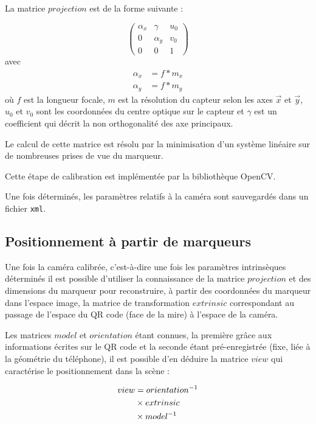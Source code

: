 \documentclass[10pt,a4paper,twoside, twocolumn]{report}
\begin{document}
La matrice $projection$ est de la forme suivante :

\begin{equation}
	\begin{pmatrix}
		\alpha_x	&	\gamma		& u_0	\\
		0					&	\alpha_y	&	v_0	\\
		0					&	0					&	1
	\end{pmatrix}
\end{equation}
avec 
\begin{align*}
	\alpha_x	&= f * m_x	\\
	\alpha_y	&= f * m_y
\end{align*}
où $f$ est la longueur focale, $m$ est la résolution du capteur selon les axes $\vec x$ et $\vec y$, $u_0$ et $v_0$ sont les coordonnées du centre optique sur le capteur et $\gamma$ est un coefficient qui décrit la non orthogonalité des axe principaux.

Le calcul de cette matrice est résolu par la minimisation d’un système linéaire sur de nombreuses prises de vue du marqueur. 

Cette étape de calibration est implémentée par la bibliothèque OpenCV.

Une fois déterminés, les paramètres relatifs à la caméra sont sauvegardés dans un fichier \texttt{xml}.

\subsection{Positionnement à partir de marqueurs}\label{section:positionnement}

Une fois la caméra calibrée, c’est-à-dire une fois les paramètres intrinsèques déterminés il est possible d’utiliser la connaissance de la matrice $projection$ et des dimensions du marqueur pour reconstruire, à partir des coordonnées du marqueur dans l’espace image, la matrice de transformation $extrinsic$ correspondant au passage de l’espace du QR code (face de la mire) à l’espace de la caméra.

Les matrices $model$ et $orientation$ étant connues, la première grâce aux informations écrites sur le QR code et la seconde étant pré-enregistrée (fixe, liée à la géométrie du téléphone), il est possible d’en déduire la matrice $view$ qui caractérise le positionnement dans la scène :

\begin{align}
	view	&=			orientation^{-1}	\notag \\
				&\times extrinsic					\notag \\
				&\times model^{-1}
\end{align}
\end{document}
